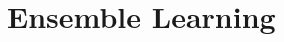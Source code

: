 \chapter{Ensemble Learning}

\begin{ex}
\end{ex}

\begin{ex}
\end{ex}

\begin{ex}
\end{ex}

\begin{ex}
\end{ex}